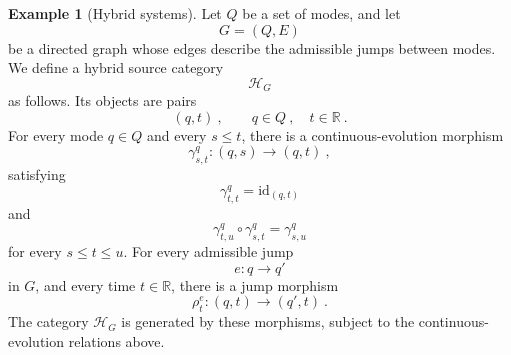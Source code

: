 \documentclass[a4paper,reqno,oneside]{amsart}
\theoremstyle{definition}
\newtheorem{example}[theorem]{Example}
\theoremstyle{remark}
\newcommand{\id}{\mathrm{id}}
\numberwithin{equation}{section}
\begin{document}
\begin{example}[Hybrid systems]
		Let $Q$ be a set of modes, and let
		\begin{equation}
			G=(Q,E)
		\end{equation}
		be a directed graph whose edges describe the admissible jumps between
		modes. We define a hybrid source category
		\begin{equation}
			\mathcal H_G
		\end{equation}
		as follows. Its objects are pairs
		\begin{equation}
			(q,t) \ ,
			\qquad q\in Q \ ,\quad t\in\mathbb R \ .
		\end{equation}
		For every mode $q\in Q$ and every $s\leq t$, there is a continuous-evolution
		morphism
		\begin{equation}
			\gamma^q_{s,t}\colon (q,s)\longrightarrow (q,t) \ ,
		\end{equation}
		satisfying
		\begin{equation}
			\gamma^q_{t,t}=\id_{(q,t)}
		\end{equation}
		and
		\begin{equation}
			\gamma^q_{t,u}\circ \gamma^q_{s,t}
			=
			\gamma^q_{s,u}
		\end{equation}
		for every $s\leq t\leq u$. For every admissible jump
		\begin{equation}
			e\colon q\longrightarrow q'
		\end{equation}
		in $G$, and every time $t\in\mathbb R$, there is a jump morphism
		\begin{equation}
			\rho^e_t\colon (q,t)\longrightarrow (q',t) \ .
		\end{equation}
		The category $\mathcal H_G$ is generated by these morphisms, subject to the
		continuous-evolution relations above.
		

\end{example}
\end{document}
